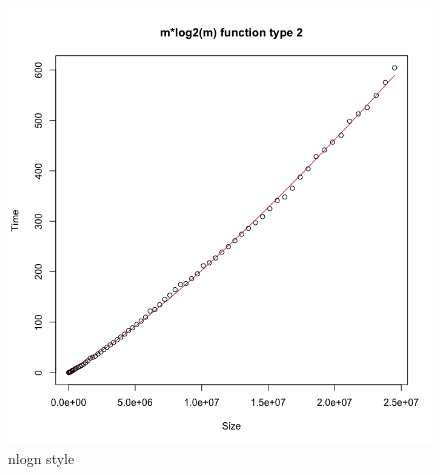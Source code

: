\documentclass{article}
\begin{document}
\begin{figure}[H]
\centering
\includegraphics[width=\linewidth]{Rplot9.png}
\caption{nlogn style}
\end{figure}
\end{document}
